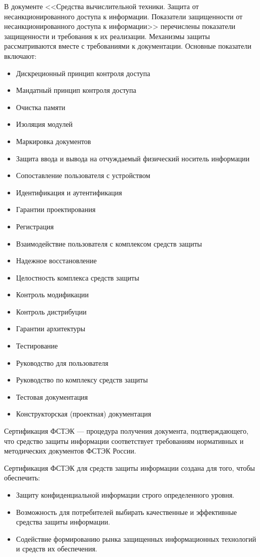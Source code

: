 В документе <<Средства вычислительной техники. Защита от несанкционированного доступа к информации. Показатели защищенности от несанкционированного доступа к информации>> перечислены показатели защищенности и требования к их реализации. Механизмы защиты рассматриваются вместе с требованиями к документации. Основные показатели включают:
\begin{itemize}
	\item Дискреционный принцип контроля доступа
	\item Мандатный принцип контроля доступа
	\item Очистка памяти
	\item Изоляция модулей
	\item Маркировка документов
	\item Защита ввода и вывода на отчуждаемый физический носитель информации
	\item Сопоставление пользователя с устройством
	\item Идентификация и аутентификация
	\item Гарантии проектирования
	\item Регистрация
	\item Взаимодействие пользователя с комплексом средств защиты
	\item Надежное восстановление
	\item Целостность комплекса средств защиты
	\item Контроль модификации
	\item Контроль дистрибуции
	\item Гарантии архитектуры
	\item Тестирование
	\item Руководство для пользователя
	\item Руководство по комплексу средств защиты
	\item Тестовая документация
	\item Конструкторская (проектная) документация
\end{itemize}

Сертификация ФСТЭК --- процедура получения документа, подтверждающего, что средство защиты информации соответствует требованиям нормативных и методических документов ФСТЭК России.

Сертификация ФСТЭК для средств защиты информации создана для того, чтобы обеспечить:
\begin{itemize}
    \item Защиту конфиденциальной информации строго определенного уровня.
    \item Возможность для потребителей выбирать качественные и эффективные средства защиты информации.
    \item Содействие формированию рынка защищенных информационных технологий и средств их обеспечения.
\end{itemize}

